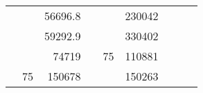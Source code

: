 \begin{table}[H]
\begin{tabular}{|ccrccrccc}
\multicolumn{1}{|c|}{\cellcolor[HTML]{FFFFC7}}                                & \multicolumn{1}{c|}{\cellcolor[HTML]{DAE8FC}}                      & \multicolumn{1}{r|}{\cellcolor[HTML]{DAE8FC}56696.8}   & \multicolumn{1}{c|}{\cellcolor[HTML]{FFFFC7}}                                & \multicolumn{1}{c|}{\cellcolor[HTML]{DAE8FC}}                       & \multicolumn{1}{r|}{\cellcolor[HTML]{DDFDFF}230042}    &                                                                              &                                                                    &                                                        \\ \cline{3-3} \cline{6-6}
\multicolumn{1}{|c|}{\cellcolor[HTML]{FFFFC7}}                                & \multicolumn{1}{c|}{\cellcolor[HTML]{DAE8FC}}                      & \multicolumn{1}{r|}{\cellcolor[HTML]{DDFDFF}59292.9}   & \multicolumn{1}{c|}{\cellcolor[HTML]{FFFFC7}}                                & \multicolumn{1}{c|}{\cellcolor[HTML]{DAE8FC}}                       & \multicolumn{1}{r|}{\cellcolor[HTML]{DAE8FC}330402}    &                                                                              &                                                                    &                                                        \\ \cline{3-3} \cline{6-6}
\multicolumn{1}{|c|}{\cellcolor[HTML]{FFFFC7}}                                & \multicolumn{1}{c|}{\cellcolor[HTML]{DAE8FC}}                      & \multicolumn{1}{r|}{\cellcolor[HTML]{DAE8FC}74719}     & \multicolumn{1}{c|}{\cellcolor[HTML]{FFFFC7}}                                & \multicolumn{1}{c|}{\multirow{-10}{*}{\cellcolor[HTML]{DAE8FC}75}}  & \multicolumn{1}{r|}{\cellcolor[HTML]{DDFDFF}110881}    &                                                                              &                                                                    &                                                        \\ \cline{3-3} \cline{5-6}
\multicolumn{1}{|c|}{\cellcolor[HTML]{FFFFC7}}                                & \multicolumn{1}{c|}{\multirow{-10}{*}{\cellcolor[HTML]{DAE8FC}75}} & \multicolumn{1}{r|}{\cellcolor[HTML]{DDFDFF}150678}    & \multicolumn{1}{c|}{\cellcolor[HTML]{FFFFC7}}                                & \multicolumn{1}{c|}{\cellcolor[HTML]{DDFDFF}}                       & \multicolumn{1}{r|}{\cellcolor[HTML]{DAE8FC}150263}    &                                                                              &                                                                    &                                                        \\ \cline{2-3} \cline{6-6}

\end{tabular}
\end{table}
